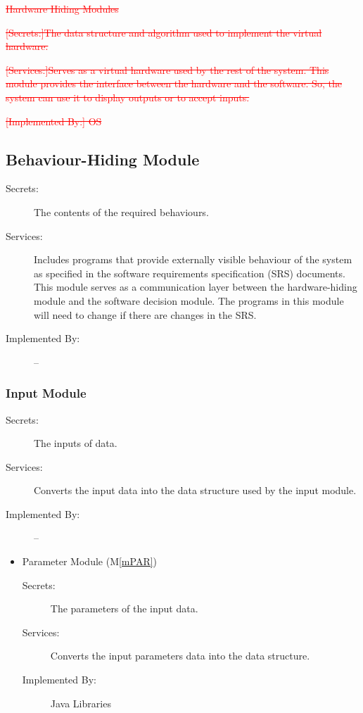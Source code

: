 \documentclass[12pt, titlepage]{article}
\newcommand{\mref}[1]{M\ref{#1}}
\begin{document}

\textcolor{red}{\sout{Hardware Hiding Modules}}

\begin{description}
\item \textcolor{red}{\sout{[Secrets:]The data structure and algorithm used to implement the virtual hardware.}}
\item \textcolor{red}{\sout{[Services:]Serves as a virtual hardware used by the rest of the
  system. This module provides the interface between the hardware and the
  software. So, the system can use it to display outputs or to accept inputs.}}
\item\textcolor{red}{\sout{[Implemented By:] OS}}
\end{description}

\subsection{Behaviour-Hiding Module}
\begin{description}
\item[Secrets:]The contents of the required behaviours.
\item[Services:]Includes programs that provide externally visible behaviour of
  the system as specified in the software requirements specification (SRS)
  documents. This module serves as a communication layer between the
  hardware-hiding module and the software decision module. The programs in this
  module will need to change if there are changes in the SRS.
\item[Implemented By:] --
\end{description}


\subsubsection{Input Module}
\begin{description}
\item[Secrets:]The inputs of data.
\item[Services:]Converts the input data into the data structure used by the input module.
\item[Implemented By:] --
\end{description}

\begin{itemize}
\item{Parameter Module (\mref{mPAR})}
\begin{description}
\item[Secrets:]The parameters of the input data.
\item[Services:]Converts the input parameters data into the data structure.
\item[Implemented By:] Java Libraries
\end{description}
\end{itemize}
\end{document}
